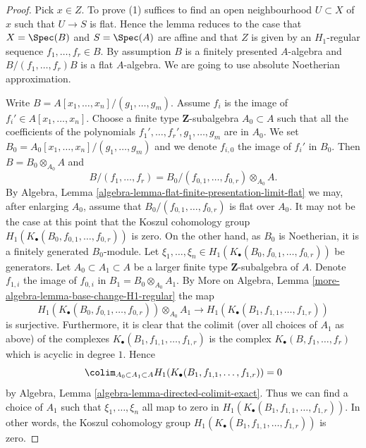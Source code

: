 \begin{proof}

Pick $x \in Z$. To prove (1) suffices to find an open neighbourhood
$U \subset X$ of $x$ such that $U \to S$ is flat. Hence the lemma reduces
to the case that $X = \Spec(B)$ and $S = \Spec(A)$ are affine
and that $Z$ is given by an $H_1$-regular sequence $f_1, \ldots, f_r \in B$.
By assumption $B$ is a finitely presented $A$-algebra and
$B/(f_1, \ldots, f_r)B$ is a flat $A$-algebra. We are going to use
absolute Noetherian approximation.

\medskip\noindent
Write $B = A[x_1, \ldots, x_n]/(g_1, \ldots, g_m)$. Assume
$f_i$ is the image of $f_i' \in A[x_1, \ldots, x_n]$. Choose a finite type
$\mathbf{Z}$-subalgebra $A_0 \subset A$ such that all the coefficients
of the polynomials $f_1', \ldots, f_r', g_1, \ldots, g_m$ are in $A_0$.
We set $B_0 = A_0[x_1, \ldots, x_n]/(g_1, \ldots, g_m)$ and we denote
$f_{i, 0}$ the image of $f_i'$ in $B_0$. Then $B = B_0 \otimes_{A_0} A$
and
$$
B/(f_1, \ldots, f_r) =
B_0/(f_{0, 1}, \ldots, f_{0, r}) \otimes_{A_0} A.
$$
By
Algebra, Lemma \ref{algebra-lemma-flat-finite-presentation-limit-flat}
we may, after enlarging $A_0$, assume that
$B_0/(f_{0, 1}, \ldots, f_{0, r})$ is flat over $A_0$.
It may not be the case at this point that the Koszul cohomology group
$H_1(K_\bullet(B_0, f_{0, 1}, \ldots, f_{0, r}))$ is zero.
On the other hand, as $B_0$ is Noetherian, it is a finitely
generated $B_0$-module. Let
$\xi_1, \ldots, \xi_n \in H_1(K_\bullet(B_0, f_{0, 1}, \ldots, f_{0, r}))$
be generators. Let $A_0 \subset A_1 \subset A$ be a larger finite type
$\mathbf{Z}$-subalgebra of $A$. Denote $f_{1, i}$ the image
of $f_{0, i}$ in $B_1 = B_0 \otimes_{A_0} A_1$. By
More on Algebra, Lemma \ref{more-algebra-lemma-base-change-H1-regular}
the map
$$
H_1(K_\bullet(B_0, f_{0, 1}, \ldots, f_{0, r})) \otimes_{A_0} A_1
\longrightarrow
H_1(K_\bullet(B_1, f_{1, 1}, \ldots, f_{1, r}))
$$
is surjective. Furthermore, it is clear that the colimit (over all
choices of $A_1$ as above) of the
complexes $K_\bullet(B_1, f_{1, 1}, \ldots, f_{1, r})$ is the complex
$K_\bullet(B, f_1, \ldots, f_r)$ which is acyclic in degree $1$. Hence
$$
\colim_{A_0 \subset A_1 \subset A}
H_1(K_\bullet(B_1, f_{1, 1}, \ldots, f_{1, r}))
= 0
$$
by
Algebra, Lemma \ref{algebra-lemma-directed-colimit-exact}.
Thus we can find a choice of $A_1$ such that $\xi_1, \ldots, \xi_n$
all map to zero in $H_1(K_\bullet(B_1, f_{1, 1}, \ldots, f_{1, r}))$.
In other words, the Koszul cohomology group
$H_1(K_\bullet(B_1, f_{1, 1}, \ldots, f_{1, r}))$
is zero.


\end{proof}
